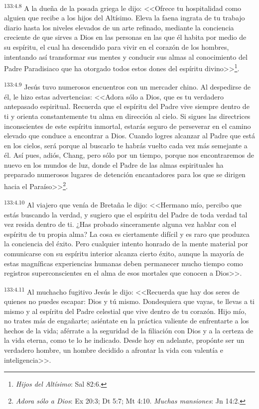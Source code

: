 \par 
\textsuperscript{133:4.8} A la dueña de la posada griega le dijo: <<Ofrece tu hospitalidad como alguien que recibe a los hijos del Altísimo. Eleva la faena ingrata de tu trabajo diario hasta los niveles elevados de un arte refinado, mediante la conciencia creciente de que sirves a Dios en las personas en las que él habita por medio de su espíritu, el cual ha descendido para vivir en el corazón de los hombres, intentando así transformar sus mentes y conducir sus almas al conocimiento del Padre Paradisiaco que ha otorgado todos estos dones del espíritu divino>>\footnote{\textit{Hijos del Altísimo}: Sal 82:6.}.

\par 
\textsuperscript{133:4.9} Jesús tuvo numerosos encuentros con un mercader chino. Al despedirse de él, le hizo estas advertencias: <<Adora sólo a Dios, que es tu verdadero antepasado espiritual. Recuerda que el espíritu del Padre vive siempre dentro de ti y orienta constantemente tu alma en dirección al cielo. Si sigues las directrices inconscientes de este espíritu inmortal, estarás seguro de perseverar en el camino elevado que conduce a encontrar a Dios. Cuando logres alcanzar al Padre que está en los cielos, será porque al buscarlo te habrás vuelto cada vez más semejante a él. Así pues, adiós, Chang, pero sólo por un tiempo, porque nos encontraremos de nuevo en los mundos de luz, donde el Padre de las almas espirituales ha preparado numerosos lugares de detención encantadores para los que se dirigen hacia el Paraíso>>\footnote{\textit{Adora sólo a Dios}: Ex 20:3; Dt 5:7; Mt 4:10. \textit{Muchas mansiones}: Jn 14:2.}.

\par 
\textsuperscript{133:4.10} Al viajero que venía de Bretaña le dijo: <<Hermano mío, percibo que estás buscando la verdad, y sugiero que el espíritu del Padre de toda verdad tal vez resida dentro de ti. ¿Has probado sinceramente alguna vez hablar con el espíritu de tu propia alma? La cosa es ciertamente difícil y es raro que produzca la conciencia del éxito. Pero cualquier intento honrado de la mente material por comunicarse con su espíritu interior alcanza cierto éxito, aunque la mayoría de estas magníficas experiencias humanas deben permanecer mucho tiempo como registros superconscientes en el alma de esos mortales que conocen a Dios>>.

\par 
\textsuperscript{133:4.11} Al muchacho fugitivo Jesús le dijo: <<Recuerda que hay dos seres de quienes no puedes escapar: Dios y tú mismo. Dondequiera que vayas, te llevas a ti mismo y al espíritu del Padre celestial que vive dentro de tu corazón. Hijo mío, no trates más de engañarte; asiéntate en la práctica valiente de enfrentarte a los hechos de la vida; aférrate a la seguridad de la filiación con Dios y a la certeza de la vida eterna, como te lo he indicado. Desde hoy en adelante, propónte ser un verdadero hombre, un hombre decidido a afrontar la vida con valentía e inteligencia>>.

